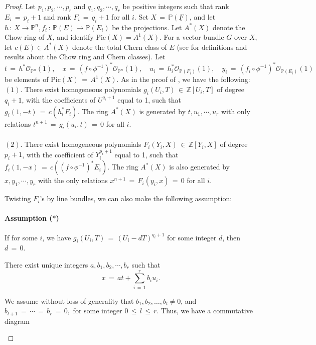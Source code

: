 \documentclass[12pt,reqno]{amsart}
\theoremstyle{definition}
\numberwithin{equation}{section}
\begin{document}
\begin{proof}
Let $p_1,p_2,\cdots,p_r$ and $q_1, q_2,\cdots,q_r$ be positive integers such that rank $E_i\,=\,p_i+1$ and rank $F_i\,=\,q_i+1$ for all $i$. Set $ X\,=\, \mathbb{P}(\underline{F})$, and let $h\,:\,X\to \mathbb{P}^n, f_i\,:\,\mathbb{P}(\underline{E})\to \mathbb{P}(E_i)$ be the projections. Let $A^{\ast}(X)$ denote the Chow ring of $X$, and identify Pic$(X)=A^1(X)$. For a vector bundle $G$ over $X$, let $c(E)\in A^{\ast}(X)$ denote the total Chern class of $E$ (see \cite{fulton2013intersection} for definitions and results about the Chow ring and Chern classes). 
Let 
\begin{equation*}
t\,=\, h^*\mathcal{O}_{\mathbb{P}^n}(1),\quad x \,=\,  (f\circ \phi^{-1})^*\mathcal{O}_{\mathbb{P}^n}(1),\quad u_{i}\,=\,h_i^*\mathcal{O}_{\mathbb{P}(F_{i})}(1),\quad y_i\,=\,(f_i\circ \phi^{-1})^*\mathcal{O}_{\mathbb{P}(E_{i})}(1)
\end{equation*}
be elements of Pic$(X) \,=\, A^{1}(X).$ 
As in the proof of {\cite[Theorem 4.4]{BSV1}}, we have the following:
\\
\noindent$(1).$ There exist homogeneous polynomials $ g_{i}(U_i,T)\,\in\, \mathbb{Z}[U_{i},T]$ of degree $ q_{i}+1$, with the coefficients of $U^{q_{i}+1}$ equal to 1, such that $g_i(1,-t)\,=\,c(h_i^*F_i).$ The ring $A^{\ast}(X)$ is generated by $t,u_1,\cdots,u_r$ with only relations $t^{n+1}\,=\,g_i(u_i, t)\,=\,0$ for all $i.$\\\\
$(2).$ There exist homogeneous polynomials $ F_{i}(Y_i,X)\,\in\, \mathbb{Z}[Y_{i},X]$ of degree $ p_{i}+1$, with the coefficient of  $Y_i^{p_{i}+1}$ equal to 1, such that $f_i(1,-x)\,=\,c((f\circ\phi^{-1})^*E_i).$ The ring $A^{\ast}(X)$ is also generated by $x,y_1,\cdots,y_r$ with the only relations $x^{n+1}\,=\,F_i(y_i, x)\,=\,0$ for all $i.$


Twisting $F_i$'s by line bundles, we can also make the following assumption:

\paragraph{\textbf{Assumption ($\ast$)}} If for some $i$, we have $g_i(U_i, T)\,=\,(U_i-dT)^{q_i+1}$ for some integer $d$, then $d\,=\,0.$

There exist unique integers $a,b_{1},b_{2},\cdots,b_{r}$ such that $$ x\,=\, at+ \sum_{i\,=\,1}^{r} b_{i}u_{i}.$$ 

We assume without loss of generality that $b_{1},b_{2},\dots ,b_{l} \neq 0$,  and $b_{l+1}\,=\, \cdots \,=\,b_{r}\,=\,0,$ for some integer $0\,\leq\, l\,\leq\, r$. Thus, we have a commutative diagram 
\begin{center}
\end{center}




\end{proof}
\end{document}
